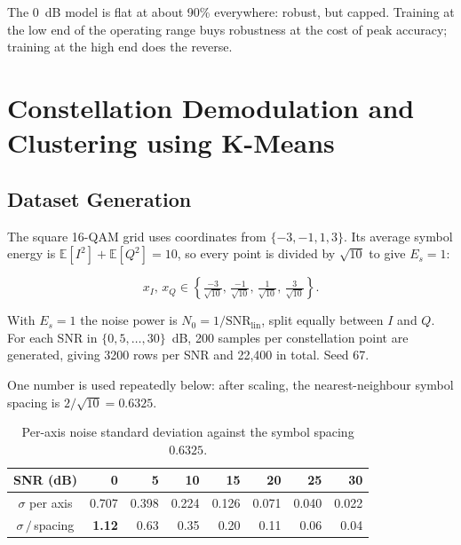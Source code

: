 \documentclass[11pt,a4paper]{article}
\begin{document}
The 0~dB model is flat at about 90\% everywhere: robust, but capped. Training at the low end of
the operating range buys robustness at the cost of peak accuracy; training at the high end does
the reverse.

\section{Constellation Demodulation and Clustering using K-Means}

\subsection{Dataset Generation}

The square 16-QAM grid uses coordinates from $\{-3,-1,1,3\}$. Its average symbol energy is
$\mathbb{E}[I^2] + \mathbb{E}[Q^2] = 10$, so every point is divided by $\sqrt{10}$ to give
$E_s = 1$:

\begin{equation}
x_I,\, x_Q \in \left\{ \tfrac{-3}{\sqrt{10}},\, \tfrac{-1}{\sqrt{10}},\,
\tfrac{1}{\sqrt{10}},\, \tfrac{3}{\sqrt{10}} \right\}.
\end{equation}

With $E_s=1$ the noise power is $N_0 = 1/\mathrm{SNR}_{\mathrm{lin}}$, split equally between
$I$ and $Q$. For each SNR in $\{0,5,\dots,30\}$~dB, 200 samples per constellation point are
generated, giving 3200 rows per SNR and 22{,}400 in total. Seed 67.

One number is used repeatedly below: after scaling, the nearest-neighbour symbol spacing is
$2/\sqrt{10} = 0.6325$.

\begin{table}[H]
\centering
\caption{Per-axis noise standard deviation against the symbol spacing $0.6325$.}
\label{tab:noise}
\begin{tabular}{crrrrrrr}
\toprule
SNR (dB) & 0 & 5 & 10 & 15 & 20 & 25 & 30 \\
\midrule
$\sigma$ per axis    & 0.707 & 0.398 & 0.224 & 0.126 & 0.071 & 0.040 & 0.022 \\
$\sigma\,/\,$spacing & \textbf{1.12} & 0.63 & 0.35 & 0.20 & 0.11 & 0.06 & 0.04 \\
\bottomrule
\end{tabular}
\end{table}
\end{document}
